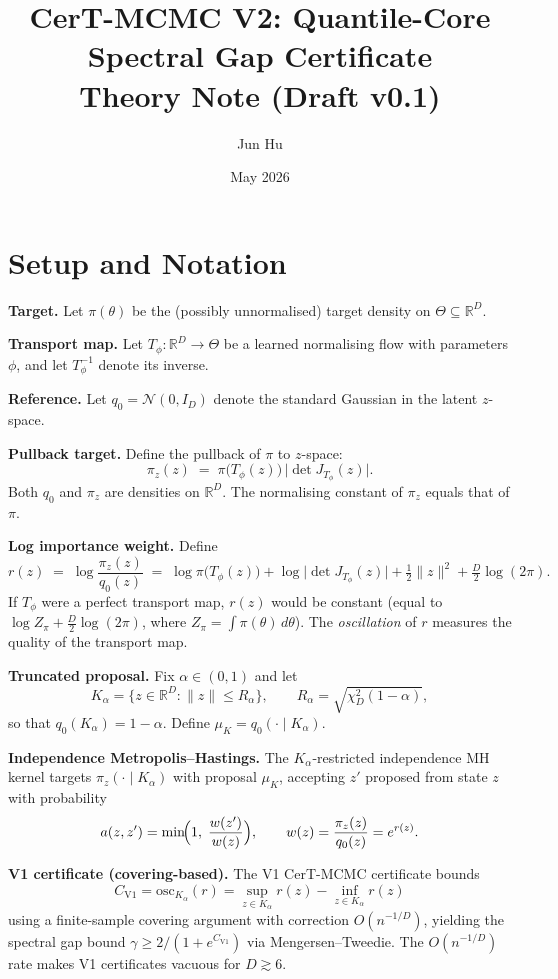 \documentclass[11pt]{article}
\title{CerT-MCMC V2: Quantile-Core Spectral Gap Certificate\\[4pt]
\large Theory Note (Draft v0.1)}
\author{Jun Hu}
\date{May 2026}
\newcommand{\R}{\mathbb{R}}
\newcommand{\osc}{\mathrm{osc}}
\begin{document}
\maketitle

\section{Setup and Notation}

\textbf{Target.} Let $\pi(\theta)$ be the (possibly unnormalised) target density on $\Theta \subseteq \R^D$.

\textbf{Transport map.} Let $T_\phi: \R^D \to \Theta$ be a learned normalising flow with parameters $\phi$, and let $T_\phi^{-1}$ denote its inverse.

\textbf{Reference.} Let $q_0 = \mathcal{N}(0, I_D)$ denote the standard Gaussian in the latent $z$-space.

\textbf{Pullback target.} Define the pullback of $\pi$ to $z$-space:
\[
  \pi_z(z) \;=\; \pi\bigl(T_\phi(z)\bigr) \,\bigl|\det J_{T_\phi}(z)\bigr|.
\]
Both $q_0$ and $\pi_z$ are densities on $\R^D$. The normalising constant of $\pi_z$ equals that of $\pi$.

\textbf{Log importance weight.} Define
\begin{equation}\label{eq:residual}
  r(z) \;=\; \log \frac{\pi_z(z)}{q_0(z)}
  \;=\; \log \pi\bigl(T_\phi(z)\bigr) + \log\bigl|\det J_{T_\phi}(z)\bigr| + \tfrac{1}{2}\|z\|^2 + \tfrac{D}{2}\log(2\pi).
\end{equation}
If $T_\phi$ were a perfect transport map, $r(z)$ would be constant (equal to $\log Z_\pi + \frac{D}{2}\log(2\pi)$, where $Z_\pi = \int \pi(\theta)\,d\theta$). The \emph{oscillation} of $r$ measures the quality of the transport map.

\textbf{Truncated proposal.} Fix $\alpha \in (0,1)$ and let
\[
  K_\alpha = \{z \in \R^D : \|z\| \le R_\alpha\}, \qquad R_\alpha = \sqrt{\chi^2_D(1-\alpha)},
\]
so that $q_0(K_\alpha) = 1-\alpha$. Define $\mu_K = q_0(\cdot \mid K_\alpha)$.

\textbf{Independence Metropolis--Hastings.} The $K_\alpha$-restricted independence MH kernel targets $\pi_z(\cdot \mid K_\alpha)$ with proposal $\mu_K$, accepting $z'$ proposed from state $z$ with probability
\[
  a(z, z') = \min\!\Bigl(1,\; \frac{w(z')}{w(z)}\Bigr), \qquad w(z) = \frac{\pi_z(z)}{q_0(z)} = e^{r(z)}.
\]

\textbf{V1 certificate (covering-based).} The V1 CerT-MCMC certificate bounds
\[
  C_{\mathrm{V1}} = \osc_{K_\alpha}(r) = \sup_{z \in K_\alpha} r(z) - \inf_{z \in K_\alpha} r(z)
\]
using a finite-sample covering argument with correction $O(n^{-1/D})$, yielding the spectral gap bound $\gamma \ge 2/(1+e^{C_{\mathrm{V1}}})$ via Mengersen--Tweedie. The $O(n^{-1/D})$ rate makes V1 certificates vacuous for $D \gtrsim 6$.
\end{document}
